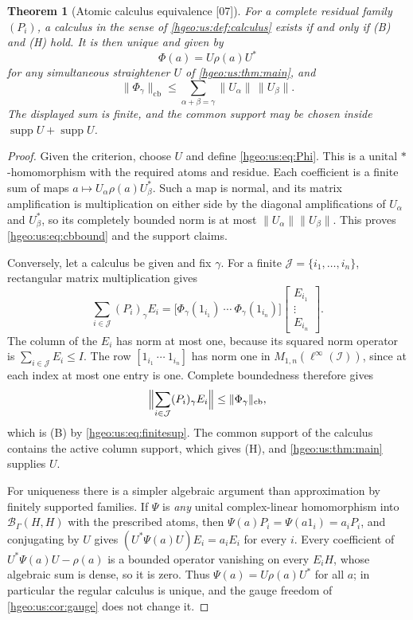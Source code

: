 \documentclass[11pt,letterpaper]{article}
\numberwithin{equation}{section}
\newtheorem{theorem}{Theorem}[section]
\theoremstyle{definition}
\theoremstyle{remark}
\newcommand{\BH}{\mathscr B_\Gamma(H,H)}
\newcommand{\supp}{\operatorname{supp}}
\newcommand{\norm}[1]{\lVert #1\rVert}
\newcommand{\src}[1]{\textup{\textsf{\small[#1]}}}
\newcommand{\cb}{\mathrm{cb}}
\begin{document}
\begin{theorem}[Atomic calculus equivalence \src{07}]
\label{hgeo:us:thm:calculus}
For a complete residual family $(P_i)$, a calculus in the sense of
\cref{hgeo:us:def:calculus} exists if and only if \textup{(B)} and
\textup{(H)} hold. It is then unique and given by
\begin{equation}\label{hgeo:us:eq:Phi}
 \Phi(a)=U\rho(a)U^*
\end{equation}
for any simultaneous straightener $U$ of \cref{hgeo:us:thm:main}, and
\begin{equation}\label{hgeo:us:eq:cbbound}
 \norm{\Phi_\gamma}_{\cb}\le
 \sum_{\alpha+\beta=\gamma}\norm{U_\alpha}\,\norm{U_\beta}.
\end{equation}
The displayed sum is finite, and the common support may be chosen inside
$\supp U+\supp U$.
\end{theorem}
\begin{proof}
Given the criterion, choose $U$ and define \eqref{hgeo:us:eq:Phi}. This is a
unital $*$-homomorphism with the required atoms and residue. Each coefficient
is a finite sum of maps $a\mapsto U_\alpha\rho(a)U_\beta^*$. Such a map is
normal, and its matrix amplification is multiplication on either side by the
diagonal amplifications of $U_\alpha$ and $U_\beta^*$, so its completely
bounded norm is at most $\norm{U_\alpha}\norm{U_\beta}$. This proves
\eqref{hgeo:us:eq:cbbound} and the support claims.

Conversely, let a calculus be given and fix $\gamma$. For a finite
$\mathcal J=\{i_1,\ldots,i_n\}$, rectangular matrix multiplication gives
\[
 \sum_{i\in\mathcal J}(P_i)_\gamma E_i
 =\bigl[\Phi_\gamma(1_{i_1})\ \cdots\ \Phi_\gamma(1_{i_n})\bigr]
 \begin{bmatrix}E_{i_1}\\ \vdots\\ E_{i_n}\end{bmatrix}.
\]
The column of the $E_i$ has norm at most one, because its squared norm
operator is $\sum_{i\in\mathcal J}E_i\le I$. The row
$[1_{i_1}\ \cdots\ 1_{i_n}]$ has norm one in
$M_{1,n}(\ell^\infty(\mathcal I))$, since at each index at most one entry is
one. Complete boundedness therefore gives
\begin{equation}\label{hgeo:us:eq:synthesiscb}
 \Bigl\|\sum_{i\in\mathcal J}(P_i)_\gamma E_i\Bigr\|
 \le\norm{\Phi_\gamma}_{\cb},
\end{equation}
which is (B) by \eqref{hgeo:us:eq:finitesup}. The common support of the
calculus contains the active column support, which gives (H), and
\cref{hgeo:us:thm:main} supplies $U$.

For uniqueness there is a simpler algebraic argument than approximation by
finitely supported families. If $\Psi$ is \emph{any} unital complex-linear
homomorphism into $\BH$ with the prescribed atoms, then
$\Psi(a)P_i=\Psi(a1_i)=a_iP_i$, and conjugating by $U$ gives
$(U^*\Psi(a)U)E_i=a_iE_i$ for every $i$. Every coefficient of
$U^*\Psi(a)U-\rho(a)$ is a bounded operator vanishing on every $E_iH$, whose
algebraic sum is dense, so it is zero. Thus $\Psi(a)=U\rho(a)U^*$ for all
$a$; in particular the regular calculus is unique, and the gauge freedom of
\cref{hgeo:us:cor:gauge} does not change it.
\end{proof}
\end{document}
